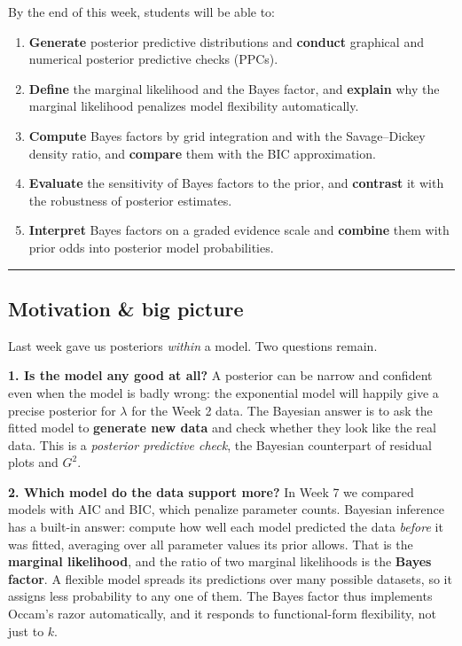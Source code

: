 By the end of this week, students will be able to:

\begin{enumerate}
\def\labelenumi{\arabic{enumi}.}
\tightlist
\item
  \textbf{Generate} posterior predictive distributions and
  \textbf{conduct} graphical and numerical posterior predictive checks
  (PPCs).
\item
  \textbf{Define} the marginal likelihood and the Bayes factor, and
  \textbf{explain} why the marginal likelihood penalizes model
  flexibility automatically.
\item
  \textbf{Compute} Bayes factors by grid integration and with the
  Savage--Dickey density ratio, and \textbf{compare} them with the BIC
  approximation.
\item
  \textbf{Evaluate} the sensitivity of Bayes factors to the prior, and
  \textbf{contrast} it with the robustness of posterior estimates.
\item
  \textbf{Interpret} Bayes factors on a graded evidence scale and
  \textbf{combine} them with prior odds into posterior model
  probabilities.
\end{enumerate}

\begin{center}\rule{0.5\linewidth}{0.5pt}\end{center}

\subsection{Motivation \& big picture}

Last week gave us posteriors \emph{within} a model. Two questions
remain.

\textbf{1. Is the model any good at all?} A posterior can be narrow and
confident even when the model is badly wrong: the exponential model will
happily give a precise posterior for \(\lambda\) for the Week 2 data.
The Bayesian answer is to ask the fitted model to \textbf{generate new
data} and check whether they look like the real data. This is a
\emph{posterior predictive check}, the Bayesian counterpart of residual
plots and \(G^2\).

\textbf{2. Which model do the data support more?} In Week 7 we compared
models with AIC and BIC, which penalize parameter counts. Bayesian
inference has a built-in answer: compute how well each model predicted
the data \emph{before} it was fitted, averaging over all parameter
values its prior allows. That is the \textbf{marginal likelihood}, and
the ratio of two marginal likelihoods is the \textbf{Bayes factor}. A
flexible model spreads its predictions over many possible datasets, so
it assigns less probability to any one of them. The Bayes factor thus
implements Occam's razor automatically, and it responds to
functional-form flexibility, not just to \(k\).

